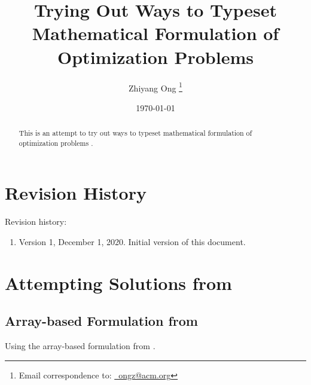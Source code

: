 \documentclass[letter,12pt]{article}
\begin{document}
\title{Trying Out Ways to Typeset Mathematical Formulation of Optimization Problems}
\date{\today}
\author{Zhiyang Ong \thanks{Email correspondence to: \href{mailto:ongz@acm.org}{\Email\ ongz@acm.org}}}
\maketitle


\begin{abstract} 
This is an attempt to try out ways to typeset mathematical formulation of optimization problems \cite{Cay2013}.
\end{abstract}


\tableofcontents
\setcounter{secnumdepth}{4}



\section*{Revision History}
\label{sec:RevisionHistory}


Revision history: \vspace{-0.3cm}
\begin{enumerate} \itemsep -4pt
\item Version 1, December 1, 2020. Initial version of this document.
\end{enumerate}









\section{Attempting Solutions from \cite{Cay2013}}
\label{sec:AttemptingSolutionsFromCay2013}


\subsection{Array-based Formulation from \cite{Cay2013}}
\label{ssec:ArrayBasedFormulationFromCay2013}

Using the array-based formulation from \cite{Cay2013}.
\end{document}
